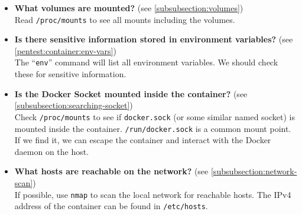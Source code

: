 \begin{itemize}
    \item \textbf{What volumes are mounted?} (see \autoref{subsubsection:volumes})\\
    Read \lstinline{/proc/mounts} to see all mounts including the volumes.

    \item \textbf{Is there sensitive information stored in environment variables?} (see \autoref{pentest:container:env-vars})\\
    The ``\lstinline{env}'' command will list all environment variables. We should check these for sensitive information.

    \item \textbf{Is the Docker Socket mounted inside the container?} (see \autoref{subsubsection:searching-socket})\\
        Check \lstinline{/proc/mounts} to see if \lstinline{docker.sock} (or some similar named socket) is mounted inside the container. \lstinline{/run/docker.sock} is a common mount point. If we find it, we can escape the container and interact with the Docker daemon on the host.

    \item \textbf{What hosts are reachable on the network?} (see \autoref{subsubsection:network-scan})\\
    If possible, use \lstinline{nmap} to scan the local network for reachable hosts. The IPv4 address of the container can be found in \lstinline{/etc/hosts}.
\end{itemize}
